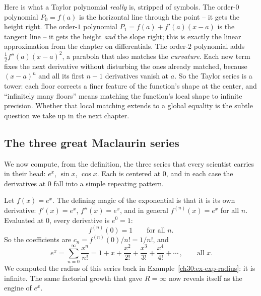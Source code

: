 \begin{happeningbox}
Here is what a Taylor polynomial \emph{really} is, stripped of symbols. The order-$0$ polynomial $P_0 = f(a)$ is the horizontal line through the point -- it gets the height right. The order-$1$ polynomial $P_1 = f(a) + f'(a)(x-a)$ is the tangent line -- it gets the height \emph{and} the slope right; this is exactly the linear approximation from the chapter on differentials. The order-$2$ polynomial adds $\tfrac{1}{2}f''(a)(x-a)^2$, a parabola that also matches the \emph{curvature}. Each new term fixes the next derivative without disturbing the ones already matched, because $(x-a)^{n}$ and all its first $n-1$ derivatives vanish at $a$. So the Taylor series is a tower: each floor corrects a finer feature of the function's shape at the center, and ``infinitely many floors'' means matching the function's local shape to infinite precision. Whether that local matching extends to a global equality is the subtle question we take up in the next chapter.
\end{happeningbox}

\subsection{The three great Maclaurin series}

We now compute, from the definition, the three series that every scientist carries in their head: $e^x$, $\sin x$, $\cos x$. Each is centered at $0$, and in each case the derivatives at $0$ fall into a simple repeating pattern.

\begin{example}
\label{ch30:ex-exp-series}
Let $f(x) = e^x$. The defining magic of the exponential is that it is its own derivative: $f'(x) = e^x$, $f''(x) = e^x$, and in general $f^{(n)}(x) = e^x$ for all $n$. Evaluated at $0$, every derivative is $e^0 = 1$:
\[
  f^{(n)}(0) = 1 \qquad \text{for all } n.
\]
So the coefficients are $c_n = f^{(n)}(0)/n! = 1/n!$, and
\[
  \boxed{\,e^x = \sum_{n=0}^{\infty} \frac{x^n}{n!}
  = 1 + x + \frac{x^2}{2!} + \frac{x^3}{3!} + \frac{x^4}{4!} + \cdots\,}, \qquad \text{all } x.
\]
We computed the radius of this series back in Example~\ref{ch30:ex-exp-radius}: it is infinite. The same factorial growth that gave $R=\infty$ now reveals itself as the engine of $e^x$.
\end{example}

